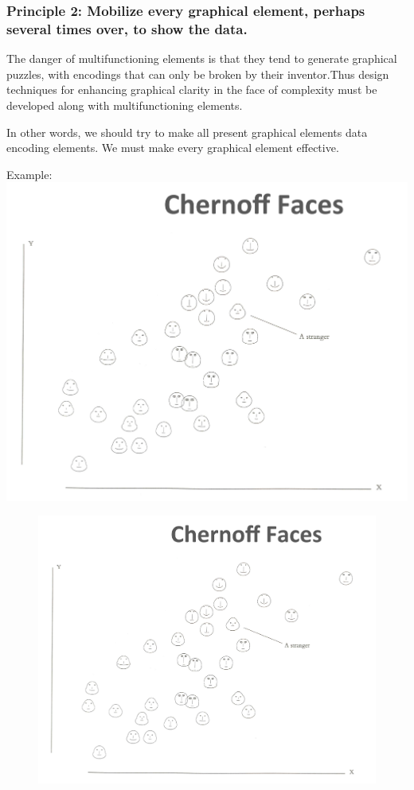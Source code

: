 \documentclass[]{book}
\theoremstyle{definition}
\theoremstyle{definition}
\theoremstyle{definition}
\theoremstyle{remark}
\begin{document}
\subsubsection{Principle 2: Mobilize every graphical element, perhaps
several times over, to show the
data.}\label{principle-2-mobilize-every-graphical-element-perhaps-several-times-over-to-show-the-data.}

The danger of multifunctioning elements is that they tend to generate
graphical puzzles, with encodings that can only be broken by their
inventor.Thus design techniques for enhancing graphical clarity in the
face of complexity must be developed along with multifunctioning
elements.

In other words, we should try to make all present graphical elements
data encoding elements. We must make every graphical element effective.

Example: \includegraphics{images/Tufte_figure6.png}

\begin{figure}
\centering
\includegraphics{images/Tufte_figure6.png}
\caption{}
\end{figure}
\end{document}
